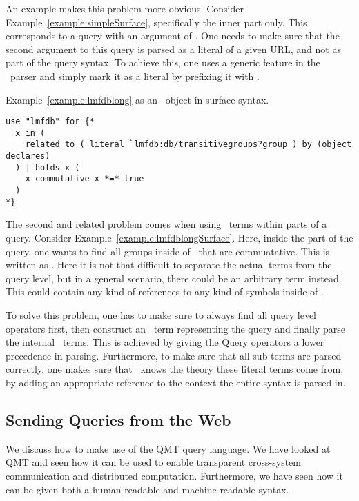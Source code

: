 An example makes this problem more obvious. 
Consider Example~\ref{example:simpleSurface}, specifically the inner part  only. 
This corresponds to a  query with an argument of . 
One needs to make sure that the second argument to this query is parsed as a literal of a given URL, and not as part of the query syntax. 
To achieve this, one uses a generic feature in the \mmt\ parser and simply mark it as a literal by prefixing it with . 

\begin{example}\label{example:lmfdblongSurface}
  Example~\ref{example:lmfdblong} as an \mmt\ object in surface syntax.  
  \begin{lstlisting}[language=qmt]
use "lmfdb" for {*
  x in (
    related to ( literal `lmfdb:db/transitivegroups?group ) by (object declares)
  ) | holds x (
    x commutative x *=* true
  )
*}
\end{lstlisting}
\end{example}

The second and related problem comes when using \mmt\ terms within parts of a query. 
Consider Example~\ref{example:lmfdblongSurface}. 
Here, inside the  part of the query, one wants to find all groups inside of \lmfdb\ that are commuatative. 
This is written as . 
Here it is not that difficult to separate the actual terms from the query level, but in a general scenario, there could be an arbitrary term instead. 
This could contain any kind of references to any kind of symbols inside of \mmt. 

To solve this problem, one has to make sure to always find all query level operators first, then construct an \mmt\ term representing the query and finally parse the internal \mmt\ terms. 
This is achieved by giving the Query operators a lower precedence in parsing. 
Furthermore, to make sure that all sub-terms are parsed correctly, one makes sure that \mmt\ knows the theory these literal terms come from, by adding an appropriate reference to the context the entire syntax is parsed in.  

\subsection{Sending Queries from the Web}\label{sec:comm:web}

We discuss how to make use of the QMT query language. 
We have looked at QMT and seen how it can be used to enable transparent cross-system communication and distributed computation. 
Furthermore, we have seen how it can be given both a human readable and machine readable syntax. 

